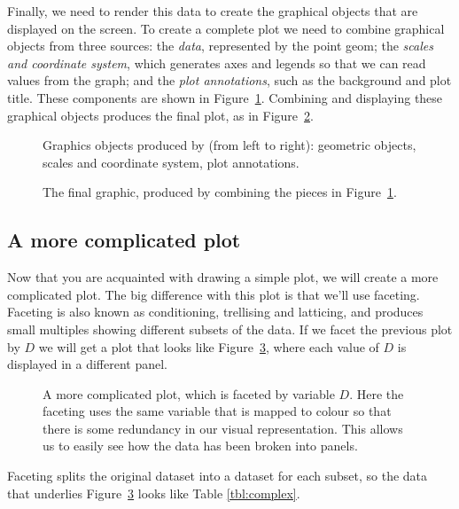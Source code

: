 Finally, we need to render this data to create the graphical objects that are displayed on the screen.  To create a complete plot we need to combine graphical objects from three sources: the \emph{data}, represented by the point geom; the \emph{scales and coordinate system}, which generates axes and legends so that we can read values from the graph; and the \emph{plot annotations}, such as the background and plot title.  These components are shown in Figure~\ref{fig:simple-exploded}.  Combining and displaying these graphical objects produces the final plot, as in Figure~\ref{fig:simple}.

\begin{figure}[htbp]
	\centering
	\caption{Graphics objects produced by (from left to right): geometric objects, scales and coordinate system, plot annotations.}
	\label{fig:simple-exploded}
\end{figure}

\begin{figure}[htbp]
	\centering
	\caption{The final graphic, produced by combining the pieces in Figure~\ref{fig:simple-exploded}.}
	\label{fig:simple}
\end{figure}

\subsection{A more complicated plot}\label{sec:how_to_build_a_more_complicated_plot} 

Now that you are acquainted with drawing a simple plot, we will create a more complicated plot.  The big difference with this plot is that we'll use faceting.  Faceting is also known as conditioning, trellising and latticing, and produces small multiples showing different subsets of the data.  If we facet the previous plot by $D$ we will get a plot that looks like Figure~\ref{fig:complex}, where each value of $D$ is displayed in a different panel.

\begin{figure}[htbp]
	\centering
	\caption{A more complicated plot, which is faceted by variable $D$.  Here the faceting uses the same variable that is mapped to colour so that there is some redundancy in our visual representation.  This allows us to easily see how the data has been broken into panels.}
	\label{fig:complex}
\end{figure}

Faceting splits the original dataset into a dataset for each subset, so the data that underlies Figure~\ref{fig:complex} looks like Table \ref{tbl:complex}.


